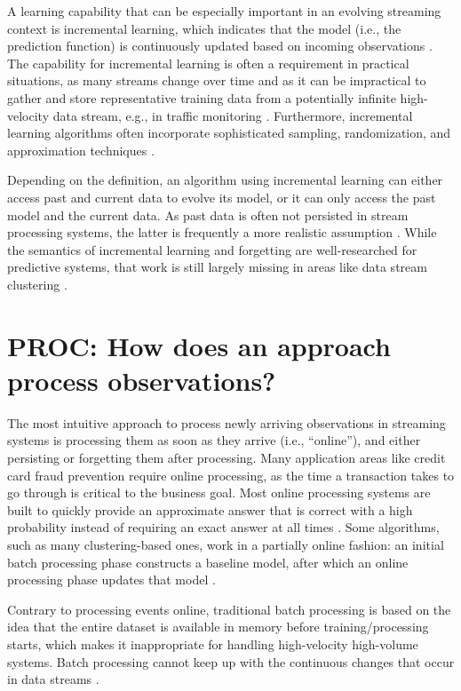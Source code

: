 A learning capability that can be especially important in an evolving streaming context is incremental learning, which indicates that the model (i.e., the prediction function) is continuously updated based on incoming observations \citep{kontaki_continuous_2011, haibo_he_incremental_2011}. The capability for incremental learning is often a requirement in practical situations, as many streams change over time and as it can be impractical to gather and store representative training data from a potentially infinite high-velocity data stream, e.g., in traffic monitoring \citep{schneider_expected_2016, haibo_he_incremental_2011}. Furthermore, incremental learning algorithms often incorporate sophisticated sampling, randomization, and approximation techniques \citep{gama_survey_2012}. 

Depending on the definition, an algorithm using incremental learning can either access past and current data to evolve its model, or it can only access the past model and the current data. As past data is often not persisted in stream processing systems, the latter is frequently a more realistic assumption \citep{haibo_he_incremental_2011}. While the semantics of incremental learning and forgetting are well-researched for predictive systems, that work is still largely missing in areas like data stream clustering \citep{gama_survey_2012}.


\section{PROC: How does an approach process observations?}
The most intuitive approach to process newly arriving observations in streaming systems is processing them as soon as they arrive (i.e., “online”), and either persisting or forgetting them after processing. Many application areas like credit card fraud prevention require online processing, as the time a transaction takes to go through is critical to the business goal. Most online processing systems are built to quickly provide an approximate answer that is correct with a high probability instead of requiring an exact answer at all times \citep{gama_survey_2012}. Some algorithms, such as many clustering-based ones, work in a partially online fashion: an initial batch processing phase constructs a baseline model, after which an online processing phase updates that model \citep{ahmad_unsupervised_2017}. 

Contrary to processing events online, traditional batch processing is based on the idea that the entire dataset is available in memory before training/processing starts, which makes it inappropriate for handling high-velocity high-volume systems. Batch processing cannot keep up with the continuous changes that occur in data streams \citep{gama_survey_2012}.

